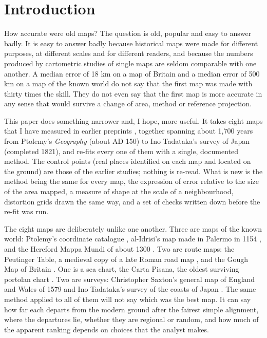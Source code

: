 \documentclass[11pt,a4paper]{article}
\begin{document}
\section{Introduction}
How accurate were old maps? The question is old, popular and easy to answer badly. It is easy to answer badly because historical maps were made for different purposes, at different scales and for different readers, and because the numbers produced by cartometric studies of single maps are seldom comparable with one another. A median error of 18 km on a map of Britain and a median error of 500 km on a map of the known world do not say that the first map was made with thirty times the skill. They do not even say that the first map is more accurate in any sense that would survive a change of area, method or reference projection.

This paper does something narrower and, I hope, more useful. It takes eight maps that I have measured in earlier preprints \citep{hotham2026ptolemy,hotham2026peutinger,hotham2026idrisi,hotham2026portolan,hotham2026hereford,hotham2026gough,hotham2026saxton,hotham2026ino}, together spanning about 1,700 years from Ptolemy's \textit{Geography} (about AD 150) to Ino Tadataka's survey of Japan (completed 1821), and re-fits every one of them with a single, documented method. The control points (real places identified on each map and located on the ground) are those of the earlier studies; nothing is re-read. What is new is the method being the same for every map, the expression of error relative to the size of the area mapped, a measure of shape at the scale of a neighbourhood, distortion grids drawn the same way, and a set of checks written down before the re-fit was run.

The eight maps are deliberately unlike one another. Three are maps of the known world: Ptolemy's coordinate catalogue \citep{berggren2000,stuckelberger2006}, al-Idrisi's map made in Palermo in 1154 \citep{ahmad1992}, and the Hereford Mappa Mundi of about 1300 \citep{harvey1996,westrem2001}. Two are route maps: the Peutinger Table, a medieval copy of a late Roman road map \citep{talbert2010}, and the Gough Map of Britain \citep{lilley2009,delanosmith2017}. One is a sea chart, the Carta Pisana, the oldest surviving portolan chart \citep{campbell1987}. Two are surveys: Christopher Saxton's general map of England and Wales of 1579 \citep{evans1979} and Ino Tadataka's survey of the coasts of Japan \citep{unno1994}. The same method applied to all of them will not say which was the best map. It can say how far each departs from the modern ground after the fairest simple alignment, where the departures lie, whether they are regional or random, and how much of the apparent ranking depends on choices that the analyst makes.
\end{document}
